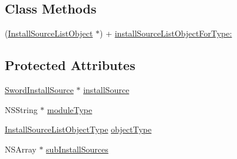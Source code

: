 \subsection*{Class Methods}
\begin{DoxyCompactItemize}
\item 
(\hyperlink{interface_install_source_list_object}{Install\-Source\-List\-Object} $\ast$) + \hyperlink{interface_install_source_list_object_ab8690f2ad51e03dd99b41e343b186a33}{install\-Source\-List\-Object\-For\-Type\-:}
\end{DoxyCompactItemize}
\subsection*{Protected Attributes}
\begin{DoxyCompactItemize}
\item 
\hyperlink{interface_sword_install_source}{Sword\-Install\-Source} $\ast$ \hyperlink{interface_install_source_list_object_a945f9f3d77e193912095aef860133b44}{install\-Source}
\item 
N\-S\-String $\ast$ \hyperlink{interface_install_source_list_object_a8eef6212740627dfe032b79265bb0d4f}{module\-Type}
\item 
\hyperlink{_install_source_list_object_8h_ac68106c51c20429f37576f8715a786e2}{Install\-Source\-List\-Object\-Type} \hyperlink{interface_install_source_list_object_a107c7013f9c699a94e7766200e01be78}{object\-Type}
\item 
N\-S\-Array $\ast$ \hyperlink{interface_install_source_list_object_a37fa6708a7039f1f75f42c38c94fcf08}{sub\-Install\-Sources}
\end{DoxyCompactItemize}


